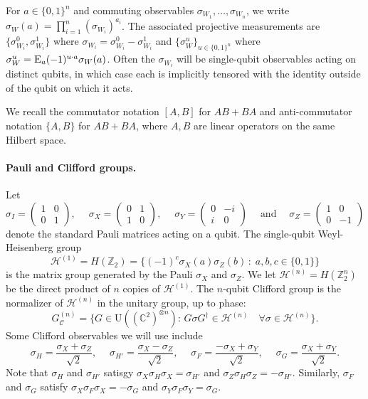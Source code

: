 \documentclass[11pt]{article}
\numberwithin{equation}{section}
\theoremstyle{definition}
\theoremstyle{plain}
\newcommand{\C}{\mathbb C}
\newcommand{\Z}{\mathbb Z}
\newcommand{\Es}[1]{\ensuremath{\mathop{\textsc{E}}}_{#1}} %
\newcommand{\setft}[1]{\mathrm{#1}}
\newcommand{\Unitary}{\setft{U}}
\newcommand{\heisg}{{\mathcal{H}^{(1)}}}
\newcommand{\heisgn}{{\mathcal{H}^{(n)}}}
\newcommand{\cliffordn}{G_\mathcal{C}^{(n)}}
\begin{document}
For $a\in\{0,1\}^n$ and commuting observables $\sigma_{W_1},\ldots,\sigma_{W_n}$, we write $\sigma_W(a) = \prod_{i=1}^n (\sigma_{W_i})^{a_i}$. The associated projective measurements are $\{\sigma_{W_i}^0,\sigma_{W_i}^1\}$ where $\sigma_{W_i} = \sigma_{W_i}^0 - \sigma_{W_i}^1$ and $\{\sigma_W^u\}_{u\in\{0,1\}^n}$ where $\sigma_W^u = \Es{a} (-1)^{u\cdot a} \sigma_W(a)$.  Often the $\sigma_{W_i}$ will be single-qubit observables acting on distinct qubits, in which case each is implicitly tensored with the identity outside of the qubit on which it acts. 

We recall the commutator notation $[A,B]$ for $AB+BA$ and anti-commutator notation $\{A,B\}$ for $AB+BA$, where $A,B$ are linear operators on the same Hilbert space. 


\paragraph{Pauli and Clifford groups.}
Let 
\begin{equation}\label{eq:pauli-matrix}
\sigma_I = \begin{pmatrix} 1 & 0 \\ 0 & 1 \end{pmatrix},\quad\; \sigma_X = \begin{pmatrix} 0 & 1 \\ 1 & 0 \end{pmatrix},\quad\; \sigma_Y = \begin{pmatrix} 0 & -i \\ i & 0 \end{pmatrix}\quad\;\text{and}\quad\; \sigma_Z = \begin{pmatrix} 1 & 0 \\ 0 & -1\end{pmatrix}
\end{equation}
denote the standard Pauli matrices acting on a qubit.  The single-qubit Weyl-Heisenberg group
$$\heisg = H(\Z_2)=\Big\{(-1)^c\sigma_X(a)\sigma_Z(b)\,:\;a,b,c\in\{0,1\}\Big\} $$
is the matrix group generated by the Pauli $\sigma_X$ and $\sigma_Z$. We let $\heisgn = H(\Z_2^n)$ be the direct product of $n$ copies of $\heisg$.  
The $n$-qubit Clifford group is the normalizer of $\heisgn$ in the unitary group, up to phase: 
$$\cliffordn = \big\{G\in\Unitary((\C^2)^{\otimes n}):\, G \sigma G^\dagger \in \heisgn \quad\forall \sigma \in \heisgn\big\}.$$
Some Clifford observables we will use include 
\begin{equation}\label{eq:pauli-matrix-2}
 \sigma_H = \frac{\sigma_X+\sigma_Z}{\sqrt{2}},\quad\; \sigma_{H'} = \frac{\sigma_X-\sigma_Z}{\sqrt{2}},\quad\; \sigma_F = \frac{-\sigma_X+\sigma_Y}{\sqrt{2}},\quad\; \sigma_{G} = \frac{\sigma_X+\sigma_Y}{\sqrt{2}}.
\end{equation}
Note that  $\sigma_H$ and $\sigma_{H'}$ satisgy $\sigma_X \sigma_H \sigma_X = \sigma_{H'}$ and $\sigma_Z \sigma_H \sigma_Z = -\sigma_{H'}$. Similarly, $\sigma_F$ and $\sigma_G$ satisfy $\sigma_X \sigma_F \sigma_X = -\sigma_G$ and $\sigma_Y \sigma_F \sigma_Y = \sigma_G$. 
\end{document}
